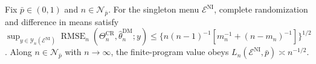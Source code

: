 Fix \(\bar p\in(0,1)\) and \(n\in\mathcal N_{\bar p}\). For the singleton menu \(\mathcal E^{\mathrm{NI}}\), complete randomization and difference in means satisfy \(\sup_{y\in\mathcal Y_n(\mathcal E^{\mathrm{NI}})}\operatorname{RMSE}_n(\Theta_n^{\mathrm{CR}},\widehat\theta_n^{\mathrm{DM}};y)\le\{n(n-1)^{-1}[m_n^{-1}+(n-m_n)^{-1}]\}^{1/2}\). Along \(n\in\mathcal N_{\bar p}\) with \(n\to\infty\), the finite-program value obeys \(L_n(\mathcal E^{\mathrm{NI}},\bar p)\asymp n^{-1/2}\).